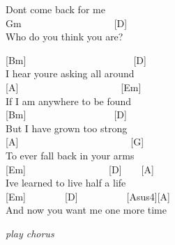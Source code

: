 \documentclass[
  letterpaper,
  a5paper]{memoir}
\begin{document}
\begin{tcolorbox}[enhanced jigsaw, breakable, bottomrule=.15mm, colframe=quarto-callout-color-frame, rightrule=.15mm, opacityback=0, colback=white, arc=.35mm, toprule=.15mm, leftrule=.75mm, left=2mm]
Don\textquotesingle t come back for me\\
Gm~~~~~~~~~~~~~~~~~~~{[}D{]}\\
Who do you think you are?

\end{tcolorbox}

{[}Bm{]}~~~~~~~~~~~~~~~~~~~~~~{[}D{]}\\
I hear you\textquotesingle re asking all around\\
{[}A{]}~~~~~~~~~~~~~~~~~~~~~{[}Em{]}\\
If I am anywhere to be found\\
{[}Bm{]}~~~~~~~~~~~~~~~~~~{[}D{]}\\
But I have grown too strong\\
{[}A{]}~~~~~~~~~~~~~~~~~~~~~~~{[}G{]}\\
To ever fall back in your arms\\
{[}Em{]}~~~~~~~~~~~~~~~~~{[}D{]}~~~~{[}A{]}\\
I\textquotesingle ve learned to live half a life\\
{[}Em{]}~~~~~~~~{[}D{]}~~~~~~~~~~{[}Asus4{]}{[}A{]}\\
And now you want me one more time

\emph{play chorus}
\end{document}
